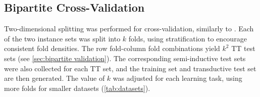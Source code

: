 \documentclass[sn-mathphys-num]{sn-jnl}%
\theoremstyle{thmstyleone}%
\theoremstyle{thmstyletwo}%
\theoremstyle{thmstylethree}%
\begin{document}





\subsection{Bipartite Cross-Validation}
\label{sec:cv}

Two-dimensional splitting was performed for cross-validation, similarly to \cite{schrynemackers_classifying_2015,pliakos_drug-target_2020}. Each of the two instance sets was split into $k$ folds, using stratification to encourage consistent fold densities. The row fold-column fold combinations yield $k^2$ TT test sets (see \autoref{sec:bipartite validation}). The corresponding semi-inductive test sets were also collected for each TT set, and the training set and transductive test set are then generated.
The value of $k$ was adjusted for each learning task, using more folds for smaller datasets (\autoref{tab:datasets}).

\end{document}
